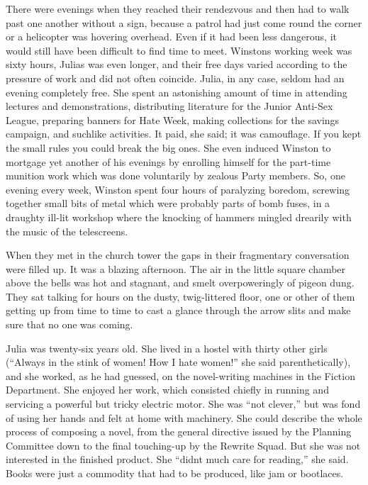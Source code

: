 There were evenings when they reached their rendezvous and then had to
walk past one another without a sign, because a patrol had just come
round the corner or a helicopter was hovering overhead. Even if it had
been less dangerous, it would still have been difficult to find time to
meet. Winston\textquotesingle s working week was sixty hours,
Julia\textquotesingle s was even longer, and their free days varied
according to the pressure of work and did not often coincide. Julia, in
any case, seldom had an evening completely free. She spent an
astonishing amount of time in attending lectures and demonstrations,
distributing literature for the Junior Anti-Sex League, preparing
banners for Hate Week, making collections for the savings campaign, and
suchlike activities. It paid, she said; it was camouflage. If you kept
the small rules you could break the big ones. She even induced Winston
to mortgage yet another of his evenings by enrolling himself for the
part-time munition work which was done voluntarily by zealous Party
members. So, one evening every week, Winston spent four hours of
paralyzing boredom, screwing together small bits of metal which were
probably parts of bomb fuses, in a draughty ill-lit workshop where the
knocking of hammers mingled drearily with the music of the telescreens.

When they met in the church tower the gaps in their fragmentary
conversation were filled up. It was a blazing afternoon. The air in the
little square chamber above the bells was hot and stagnant, and smelt
overpoweringly of pigeon dung. They sat talking for hours on the dusty,
twig-littered floor, one or other of them getting up from time to time
to cast a glance through the arrow slits and make sure that no one was
coming.

Julia was twenty-six years old. She lived in a hostel with thirty other
girls (``Always in the stink of women! How I hate women!'' she said
parenthetically), and she worked, as he had guessed, on the
novel-writing machines in the Fiction Department. She enjoyed her work,
which consisted chiefly in running and servicing a powerful but tricky
electric motor. She was ``not clever,'' but was fond of using her hands
and felt at home with machinery. She could describe the whole process of
composing a novel, from the general directive issued by the Planning
Committee down to the final touching-up by the Rewrite Squad. But she
was not interested in the finished product. She ``didn\textquotesingle t
much care for reading,'' she said. Books were just a commodity that had
to be produced, like jam or bootlaces.

